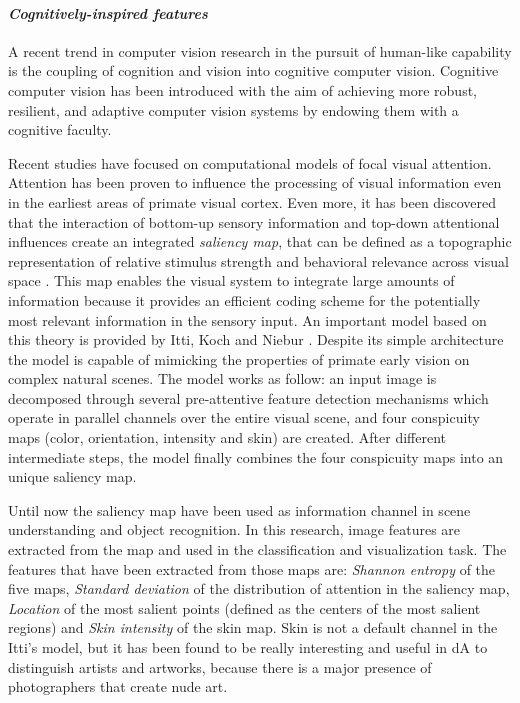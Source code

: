 \paragraph{\textit{Cognitively-inspired features}\label{proposed-cognitive}}
A recent trend in computer vision research in the pursuit of human-like capability is the coupling of cognition and vision into cognitive computer vision. Cognitive computer vision has been introduced with the aim of achieving more robust, resilient, and adaptive computer vision systems by endowing them with a cognitive faculty.

Recent studies have focused on computational models of focal visual attention. Attention has been proven to influence the processing of visual information even in the earliest areas of primate visual cortex. Even more, it has been discovered that the interaction of bottom-up sensory information and top-down attentional influences create an integrated \textit{saliency map}, that can be defined as a topographic representation of relative stimulus strength and behavioral relevance across visual space \cite{Saliency_WWHW}. This map enables the visual system to integrate large amounts of information because it provides an efficient coding scheme for the potentially most relevant information in the sensory input. 
An important model based on this theory is provided by Itti, Koch and Niebur \cite{Itti_review,Itti_model}. Despite its simple architecture the model is capable of mimicking the properties of primate early vision on complex natural scenes.
The model works as follow: an input image is decomposed through several pre-attentive feature detection mechanisms which operate in parallel channels over the entire visual scene, and four conspicuity maps (color, orientation, intensity and skin) are created. After different intermediate steps, the model finally combines the four conspicuity maps into an unique saliency map. 

Until now the saliency map have been used as information channel in scene understanding and object recognition. In this research, image features are extracted from the map and used in the classification and visualization task. The features that have been extracted from those maps are: \textit{Shannon entropy} of the five maps, \textit{Standard deviation} of the distribution of attention in the saliency map, \textit{Location} of the most salient points (defined as the centers of the most salient regions) and \textit{Skin intensity} of the skin map. Skin is not a default channel in the Itti's model, but it has been found to be really interesting and useful in dA to distinguish artists and artworks, because there is a major presence of photographers that create nude art. 

